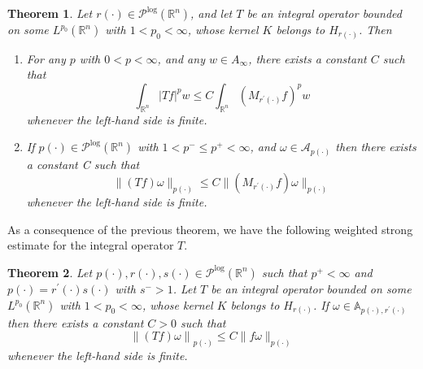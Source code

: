 \documentclass[a4paper,11pt,reqno]{amsart}
\theoremstyle{plain}
\numberwithin{equation}{section}
\newtheorem{teo}{Theorem}[section]
\theoremstyle{definition}
\newcommand{\R}{{\mathbb{R}^n}}
\begin{document}
\begin{teo}\label{teo Hör}
	Let $r(\cdot)\in\mathcal{P}^{\log}(\R)$, and let $T$ be an integral operator bounded on some $L^{p_0}(\R)$ with $1<p_0<\infty$, whose kernel $K$ belongs to $H_{r(\cdot)}$. Then
	\begin{enumerate}[label=\alph*)]
		\item \label{a del teo Hör}
		For any $p$ with $0<p<\infty$, and any $w\in A_\infty$, there exists a constant $C$ such that
		\begin{equation*}
			\int_{\R}|Tf|^p w\leq C\int_{\R}\left(M_{r^\prime(\cdot)}f\right)^p w
		\end{equation*}
		whenever the left-hand side is finite.	
		\item \label{b del teo Hör}
		If $p(\cdot)\in\mathcal{P}^{\text{log}}(\R)$ with $1<p^-\leq p^+<\infty$, and $\omega\in \mathcal{A}_{p(\cdot)}$ then there exists a constant C such that
		\begin{equation*}
			\|(Tf)\omega\|_{p(\cdot)}\leq C \|(M_{r^\prime(\cdot)}f)\omega\|_{p(\cdot)}
		\end{equation*}
		whenever the left-hand side is finite.	
	\end{enumerate}
\end{teo}
As a consequence of the previous theorem, we have the following weighted strong estimate for the integral operator $T$.
\begin{teo}\label{teo T}
		Let ${p(\cdot)},{r(\cdot)},s(\cdot)\in\mathcal{P}^{\log}(\R)$ such that $p^+<\infty$ and ${p(\cdot)}={r^\prime(\cdot)}{s(\cdot)}$ with $s^->1$. Let $T$ be an integral operator bounded on some $L^{p_0}(\R)$ with $1<p_0<\infty$, whose kernel $K$ belongs to $H_{r(\cdot)}$. If $\omega\in \mathbb{A}_{{p(\cdot)},{r^\prime(\cdot)}}$ then there exists a constant $C>0$ such that 
	$$\left\|(T f)\omega\right\|_{p(\cdot)}\leq C\|f\omega\|_{p(\cdot)}$$
	   whenever the left-hand side is finite.	
 \end{teo}
\end{document}
